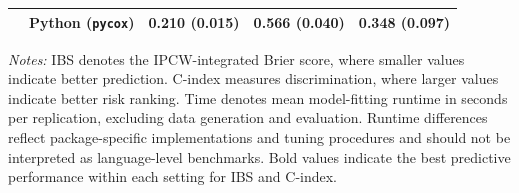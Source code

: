 \begin{table}[htbp]
\begin{tabular}{lllcc}
 & Python (\texttt{pycox}) & 0.210 (0.015) & 0.566 (0.040) & 0.348 (0.097) \\
\hline
\end{tabular}
\vspace{4pt}
\begin{minipage}{\linewidth}
\footnotesize
\textit{Notes:}
IBS denotes the IPCW-integrated Brier score, where smaller values indicate better prediction.
C-index measures discrimination, where larger values indicate better risk ranking.
Time denotes mean model-fitting runtime in seconds per replication, excluding data generation and evaluation.
Runtime differences reflect package-specific implementations and tuning procedures and should not be interpreted as language-level benchmarks.
Bold values indicate the best predictive performance within each setting for IBS and C-index.
\end{minipage}
\end{table}

